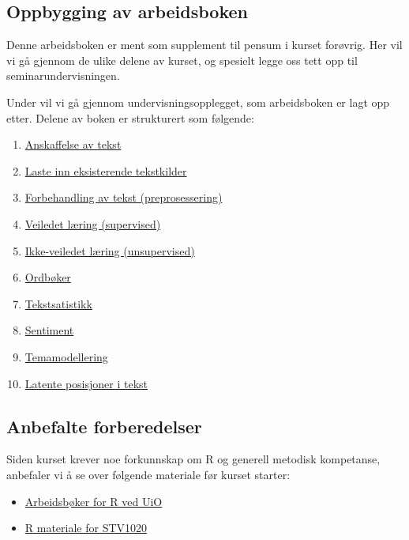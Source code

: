 \documentclass[
]{article}
\providecommand{\tightlist}{%
  \setlength{\itemsep}{0pt}\setlength{\parskip}{0pt}}
\begin{document}
\hypertarget{oppbygging-av-arbeidsboken}{%
\subsection{Oppbygging av
arbeidsboken}\label{oppbygging-av-arbeidsboken}}

Denne arbeidsboken er ment som supplement til pensum i kurset forøvrig.
Her vil vi gå gjennom de ulike delene av kurset, og spesielt legge oss
tett opp til seminarundervisningen.

Under vil vi gå gjennom undervisningsopplegget, som arbeidsboken er lagt
opp etter. Delene av boken er strukturert som følgende:

\begin{enumerate}
\def\labelenumi{\arabic{enumi}.}
\tightlist
\item
  \protect\hyperlink{anskaff}{Anskaffelse av tekst}
\item
  \protect\hyperlink{lastetekst}{Laste inn eksisterende tekstkilder}
\item
  \protect\hyperlink{prepros}{Forbehandling av tekst (preprosessering)}
\item
  \protect\hyperlink{sup}{Veiledet læring (supervised)}
\item
  \protect\hyperlink{unsup}{Ikke-veiledet læring (unsupervised)}
\item
  \protect\hyperlink{ordboker}{Ordbøker}
\item
  \protect\hyperlink{tekststats}{Tekstsatistikk}
\item
  \protect\hyperlink{sentiment}{Sentiment}
\item
  \protect\hyperlink{topicmod}{Temamodellering}
\item
  \protect\hyperlink{posisjon}{Latente posisjoner i tekst}
\end{enumerate}

\hypertarget{anbefalte-forberedelser}{%
\subsection{Anbefalte forberedelser}\label{anbefalte-forberedelser}}

Siden kurset krever noe forkunnskap om R og generell metodisk
kompetanse, anbefaler vi å se over følgende materiale før kurset
starter:

\begin{itemize}
\tightlist
\item
  \href{https://shinyibv02.uio.no/connect/\#/apps/55/access}{Arbeidsbøker
  for R ved UiO}
\item
  \href{https://github.com/liserodland/STV1020}{R materiale for STV1020}
\end{itemize}
\end{document}
